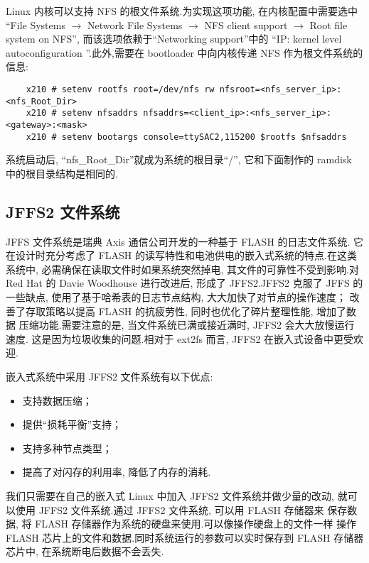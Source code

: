 	Linux 内核可以支持 NFS 的根文件系统.为实现这项功能, 在内核配置中需要选中
``File Systems $\to$ Network File Systems $\to$  NFS client support  $\to$
 Root file system on NFS'', 而该选项依赖于``Networking support''中的
``IP: kernel level autoconfiguration ''.此外,需要在 bootloader 中向内核传递
NFS 作为根文件系统的信息:

\begin{boxedminipage}{.9\textwidth}
\begin{verbatim}
	x210 # setenv rootfs root=/dev/nfs rw nfsroot=<nfs_server_ip>:<nfs_Root_Dir>
	x210 # setenv nfsaddrs nfsaddrs=<client_ip>:<nfs_server_ip>:<gateway>:<mask>
	x210 # setenv bootargs console=ttySAC2,115200 $rootfs $nfsaddrs
\end{verbatim}
\end{boxedminipage}

	系统启动后, ``nfs\_Root\_Dir''就成为系统的根目录``/'', 它和下面制作的
ramdisk 中的根目录结构是相同的.

\subsection{JFFS2 文件系统}
	JFFS 文件系统是瑞典 Axis 通信公司开发的一种基于 FLASH 的日志文件系统.
它在设计时充分考虑了 FLASH 的读写特性和电池供电的嵌入式系统的特点.在这类
系统中, 必需确保在读取文件时如果系统突然掉电, 其文件的可靠性不受到影响.对
Red Hat 的 Davie Woodhouse 进行改进后, 形成了 JFFS2.JFFS2 克服了 JFFS
的一些缺点, 使用了基于哈希表的日志节点结构, 大大加快了对节点的操作速度；
改善了存取策略以提高 FLASH 的抗疲劳性, 同时也优化了碎片整理性能, 增加了数据
压缩功能.需要注意的是, 当文件系统已满或接近满时, JFFS2 会大大放慢运行速度.
这是因为垃圾收集的问题.相对于 ext2fs 而言, JFFS2 在嵌入式设备中更受欢迎.

	嵌入式系统中采用 JFFS2 文件系统有以下优点:
\begin{itemize}\itemsep=-3pt
  \item 支持数据压缩；
  \item 提供``损耗平衡''支持；
  \item 支持多种节点类型；
  \item 提高了对闪存的利用率, 降低了内存的消耗.
\end{itemize}

	我们只需要在自己的嵌入式 Linux 中加入 JFFS2 文件系统并做少量的改动, 
就可以使用 JFFS2 文件系统.通过 JFFS2 文件系统, 可以用 FLASH 存储器来
保存数据, 将 FLASH 存储器作为系统的硬盘来使用.可以像操作硬盘上的文件一样
操作 FLASH 芯片上的文件和数据.同时系统运行的参数可以实时保存到 FLASH
存储器芯片中, 在系统断电后数据不会丢失.

